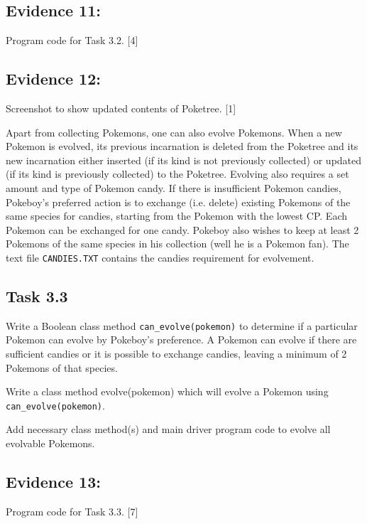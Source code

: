 \subsection*{Evidence 11: }

Program code for Task 3.2.\hfill{} {[}4{]}

\subsection*{Evidence 12:}

Screenshot to show updated contents of Poketree.\hfill{} {[}1{]}

Apart from collecting Pokemons, one can also evolve Pokemons. When
a new Pokemon is evolved, its previous incarnation is deleted from
the Poketree and its new incarnation either inserted (if its kind
is not previously collected) or updated (if its kind is previously
collected) to the Poketree. Evolving also requires a set amount and
type of Pokemon candy. If there is insufficient Pokemon candies, Pokeboy's
preferred action is to exchange (i.e. delete) existing Pokemons of
the same species for candies, starting from the Pokemon with the lowest
CP. Each Pokemon can be exchanged for one candy. Pokeboy also wishes
to keep at least 2 Pokemons of the same species in his collection
(well he is a Pokemon fan). The text file \texttt{CANDIES.TXT} contains
the candies requirement for evolvement. 

\subsection*{Task 3.3 }

Write a Boolean class method \texttt{can\_evolve(pokemon)} to determine
if a particular Pokemon can evolve by Pokeboy's preference. A Pokemon
can evolve if there are sufficient candies or it is possible to exchange
candies, leaving a minimum of 2 Pokemons of that species.

Write a class method evolve(pokemon) which will evolve a Pokemon using
\texttt{can\_evolve(pokemon)}. 

Add necessary class method(s) and main driver program code to evolve
all evolvable Pokemons. 

\subsection*{Evidence 13: }

Program code for Task 3.3.\hfill{} {[}7{]}

